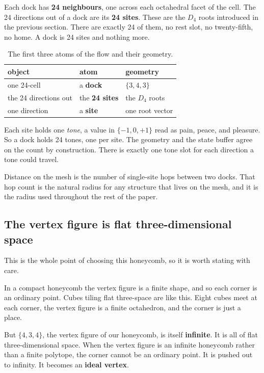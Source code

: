 Each dock has \textbf{24 neighbours}, one across each octahedral facet of the cell. The 24 directions out of a dock are its \textbf{24 sites}. These are the $D_4$ roots introduced in the previous section. There are exactly 24 of them, no rest slot, no twenty-fifth, no home. A dock is 24 sites and nothing more.

\begin{table}[ht]
\centering
\begin{tabular}{@{}lll@{}}
\toprule
object & atom & geometry \\
\midrule
one 24-cell & a \textbf{dock} & $\{3,4,3\}$ \\
the 24 directions out & the \textbf{24 sites} & the $D_4$ roots \\
one direction & a \textbf{site} & one root vector \\
\bottomrule
\end{tabular}
\caption{The first three atoms of the flow and their geometry.}
\label{tab:dock-site-geometry}
\end{table}

Each site holds one \emph{tone}, a value in $\{-1, 0, +1\}$ read as pain, peace, and pleasure. So a dock holds 24 tones, one per site. The geometry and the state buffer agree on the count by construction. There is exactly one tone slot for each direction a tone could travel.

Distance on the mesh is the number of single-site hops between two docks. That hop count is the natural radius for any structure that lives on the mesh, and it is the radius used throughout the rest of the paper.

\subsection{The vertex figure is flat three-dimensional space}

This is the whole point of choosing this honeycomb, so it is worth stating with care.

In a compact honeycomb the vertex figure is a finite shape, and so each corner is an ordinary point. Cubes tiling flat three-space are like this. Eight cubes meet at each corner, the vertex figure is a finite octahedron, and the corner is just a place.

But $\{4,3,4\}$, the vertex figure of our honeycomb, is itself \textbf{infinite}. It is all of flat three-dimensional space. When the vertex figure is an infinite honeycomb rather than a finite polytope, the corner cannot be an ordinary point. It is pushed out to infinity. It becomes an \textbf{ideal vertex}.

